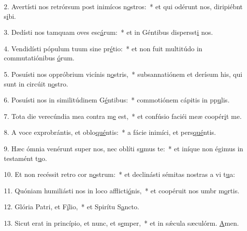 2. Avertísti nos retrórsum post inimícos n\uline{o}stros:~* et qui odérunt nos, diripiébnt s\uline{i}bi.\par 
3. Dedísti nos tamquam oves esc\uline{á}rum:~* et in Géntibus dispersst\uline{i} nos.\par 
4. Vendidísti pópulum tuum sine pr\uline{é}tio:~* et non fuit multitúdo in commutatiónibus \uline{ó}rum.\par 
5. Posuísti nos oppróbrium vicínis n\uline{o}stris,~* subsannatiónem et derísum his, qui sunt in circúit n\uline{o}stro.\par 
6. Posuísti nos in similitúdinem G\uline{é}ntibus:~* commotiónem cápitis in pp\uline{u}lis.\par 
7. Tota die verecúndia mea contra m\uline{e} est,~* et confúsio faciéi meæ coopér\uline{i}t me.\par 
8. A voce exprobrántis, et oblo\uline{qué}ntis:~* a fácie inimíci, et pers\uline{qué}ntis.\par 
9. Hæc ómnia venérunt super nos, nec oblíti s\uline{u}mus te:~* et iníque non égimus in testamént t\uline{u}o.\par 
10. Et non recéssit retro cor n\uline{o}strum:~* et declinásti sémitas nostras a vi t\uline{u}a:\par 
11. Quóniam humiliásti nos in loco afflicti\uline{ó}nis,~* et coopéruit nos umbr m\uline{o}rtis.\par 
12. Glória Patri, et F\uline{í}lio,~* et Spirítu S\uline{a}ncto.\par 
13. Sicut erat in princípio, et nunc, et s\uline{e}mper,~* et in sǽcula sæculórm. \uline{A}men.\par 
